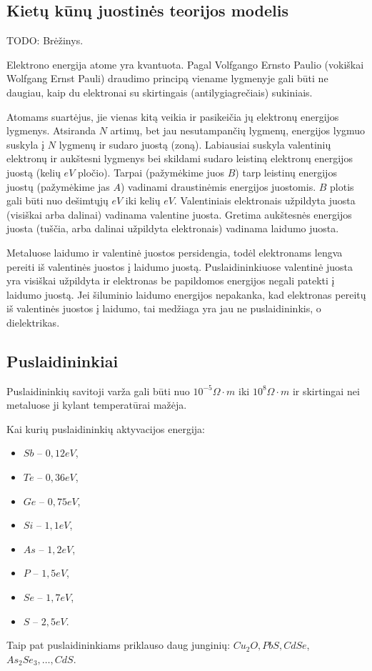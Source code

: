 \subsection{Kietų kūnų juostinės teorijos modelis}

TODO: Brėžinys.

Elektrono energija atome yra kvantuota. Pagal Volfgango Ernsto Paulio
(vokiškai Wolfgang Ernst Pauli) draudimo principą viename lygmenyje
gali būti ne daugiau, kaip du elektronai su skirtingais
(antilygiagrečiais) sukiniais.

Atomams suartėjus, jie vienas kitą veikia ir pasikeičia jų elektronų
energijos lygmenys. Atsiranda $N$ artimų, bet jau nesutampančių lygmenų,
energijos lygmuo suskyla į $N$ lygmenų ir sudaro juostą (zoną).
Labiausiai suskyla valentinių elektronų ir aukštesni lygmenys bei
skildami sudaro leistiną elektronų energijos juostą (kelių $eV$ pločio).
Tarpai (pažymėkime juos $B$) tarp leistinų energijos juostų (pažymėkime
jas $A$) vadinami draustinėmis energijos juostomis. $B$ plotis gali
būti nuo dešimtųjų $eV$ iki kelių $eV$. Valentiniais elektronais
užpildyta juosta (visiškai arba dalinai) vadinama valentine juosta.
Gretima aukštesnės energijos juosta (tuščia, arba dalinai užpildyta
elektronais) vadinama laidumo juosta.

Metaluose laidumo ir valentinė juostos persidengia, todėl elektronams
lengva pereiti iš valentinės juostos į laidumo juostą. Puslaidininkiuose
valentinė juosta yra visiškai užpildyta ir elektronas be papildomos
energijos negali patekti į laidumo juostą. Jei šiluminio laidumo
energijos nepakanka, kad elektronas pereitų iš valentinės juostos į
laidumo, tai medžiaga yra jau ne puslaidininkis, o dielektrikas.

\subsection{Puslaidininkiai}

Puslaidininkių savitoji varža gali būti nuo $10^{-5} \Omega \cdot m$
iki $10^{8} \Omega \cdot m$ ir skirtingai nei metaluose ji kylant
temperatūrai mažėja.

Kai kurių puslaidininkių aktyvacijos energija:
\begin{itemize}
  \item $Sb$ – $0,12 eV$,
  \item $Te$ – $0,36 eV$,
  \item $Ge$ – $0,75 eV$,
  \item $Si$ – $1,1 eV$,
  \item $As$ – $1,2 eV$,
  \item $P$  – $1,5 eV$,
  \item $Se$ – $1,7 eV$,
  \item $S$  – $2,5 eV$.
\end{itemize}
Taip pat puslaidininkiams priklauso daug junginių: $Cu_{2}O, PbS, CdSe$,
$As_{2}Se_{3},\ldots,CdS$.

